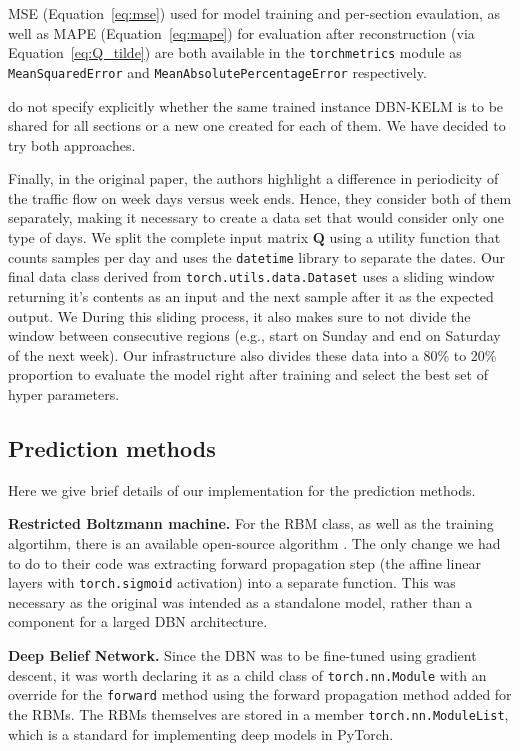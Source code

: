 MSE (Equation~\ref{eq:mse}) used for model training and per-section evaulation,
as well as MAPE (Equation~\ref{eq:mape}) for evaluation after reconstruction
(via Equation~\ref{eq:Q_tilde}) are both available in the \texttt{torchmetrics}
module as \texttt{MeanSquaredError} and \texttt{MeanAbsolutePercentageError}
respectively.

\citet{Han.2020} do not specify explicitly whether the same trained instance
DBN-KELM is to be shared for all sections or a new one created for each of them.
We have decided to try both approaches.

Finally, in the original paper, the authors highlight a difference in
periodicity of the traffic flow on week days versus week ends. Hence, they
consider both of them separately, making it necessary to create a data set that
would consider only one type of days. We split the complete input matrix
$\mathbf{Q}$ using a utility function that counts samples per day and uses the
\texttt{datetime} library to separate the dates. Our final data class derived
from \texttt{torch.utils.data.Dataset} uses a sliding window returning it's
contents as an input and the next sample after it as the expected output. We
During this sliding process, it also makes sure to not divide the window between
consecutive regions (e.g., start on Sunday and end on Saturday of the next
week). Our infrastructure also divides these data into a 80\% to 20\% proportion
to evaluate the model right after training and select the best set of hyper
parameters.

\subsection{Prediction methods}

Here we give brief details of our implementation for the prediction methods.

\textbf{Restricted Boltzmann machine.} For the RBM class, as well as the
training algortihm, there is an available open-source algorithm
\cite{Nguyen.2019}. The only change we had to do to their code was extracting
forward propagation step (the affine linear layers with \texttt{torch.sigmoid}
activation) into a separate function. This was necessary as the original was
intended as a standalone model, rather than a component for a larged DBN
architecture.

\textbf{Deep Belief Network.} Since the DBN was to be fine-tuned using gradient
descent, it was worth declaring it as a child class of \texttt{torch.nn.Module}
with an override for the \texttt{forward} method using the forward propagation
method added for the RBMs. The RBMs themselves are stored in a member
\texttt{torch.nn.ModuleList}, which is a standard for implementing deep models
in PyTorch.

